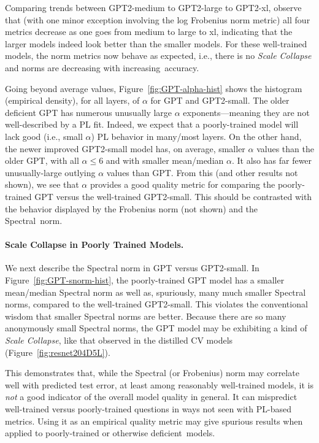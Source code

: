 Comparing trends between GPT2-medium to GPT2-large to GPT2-xl,
observe that (with one minor exception involving the log Frobenius norm metric) all four metrics decrease as one goes from medium to large to xl, indicating that the larger models indeed look better than the smaller models.
For these well-trained models, the norm metrics now behave as expected, i.e., there is no \emph{Scale Collapse} and norms are decreasing with increasing~accuracy.

Going beyond average values, Figure~\ref{fig:GPT-alpha-hist} shows the histogram (empirical density), for all layers, of $\alpha$ for GPT and GPT2-small.  
The older deficient GPT has numerous unusually large $\alpha$ exponents---meaning they are not well-described by a PL fit.
Indeed, we expect that a poorly-trained model will lack good (i.e., small $\alpha$) PL behavior in many/most layers.
On the other hand, the newer improved GPT2-small model has, on average, smaller $\alpha$ values than the older GPT, with all $\alpha\le6$ and with smaller mean/median $\alpha$.
It also has far fewer unusually-large outlying $\alpha$ values than GPT.
From this (and other results not shown), we see that $\alpha$ provides a good quality metric for comparing the poorly-trained GPT versus the well-trained GPT2-small.
This should be contrasted with the behavior displayed by the Frobenius norm (not shown) and the Spectral~norm.


\paragraph{Scale Collapse in Poorly Trained Models.}

We next describe the Spectral norm in GPT versus GPT2-small.
In Figure~\ref{fig:GPT-snorm-hist}, the poorly-trained GPT model has a smaller mean/median Spectral norm as well as, spuriously, many much smaller Spectral norms, compared to the well-trained GPT2-small.
This violates the conventional wisdom that smaller Spectral norms are better.
Because there are so many anonymously small Spectral norms, the GPT model may be exhibiting a kind of \emph{Scale Collapse}, like that observed in the distilled CV models (Figure~\ref{fig:resnet204D5L}).

This demonstrates that, while the Spectral (or Frobenius) norm may correlate well with predicted test error, at least among reasonably well-trained models, it is \emph{not} a good indicator of the overall model quality in general.
It can mispredict well-trained versus poorly-trained questions in ways not seen with PL-based metrics.
Using it as an empirical quality metric may give spurious results when applied to poorly-trained or otherwise deficient~models. 

